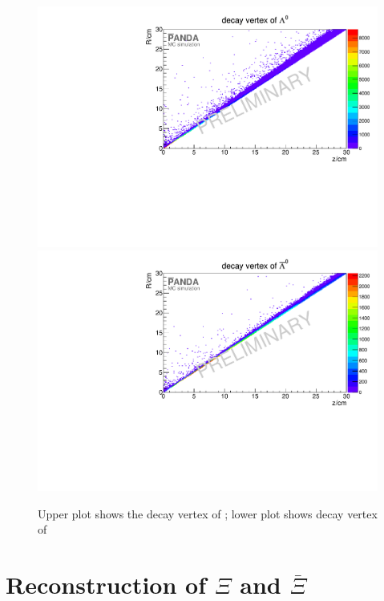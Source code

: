 		\begin{figure}
		
			\centering
			\includegraphics[width=1.\textwidth]{./plots/lambda0/lambda0_decay_vtx.pdf}
			\includegraphics[width=1.\textwidth]{./plots/antilambda0/antiLambda0_decay_vtx.pdf}
			\caption{\propose Upper plot shows the decay vertex of \lam; lower plot shows decay vertex of \alam}
			\label{fig:lambda0_antilambda0_decay_vtx}
		
		\end{figure}
		
		
		
		
	
\section{Reconstruction of $\Xi$ and $\bar{\Xi}$}
